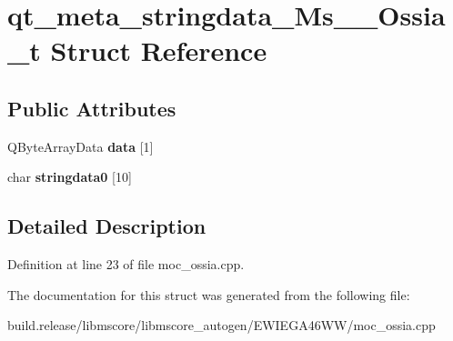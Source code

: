 \hypertarget{structqt__meta__stringdata___ms_____ossia__t}{}\section{qt\+\_\+meta\+\_\+stringdata\+\_\+\+Ms\+\_\+\+\_\+\+Ossia\+\_\+t Struct Reference}
\label{structqt__meta__stringdata___ms_____ossia__t}
\subsection*{Public Attributes}
\begin{DoxyCompactItemize}
\item 
\mbox{\label{structqt__meta__stringdata___ms_____ossia__t_a6a14c4652021f1ccadd269c8901628c2}} 
Q\+Byte\+Array\+Data {\bfseries data} \mbox{[}1\mbox{]}
\item 
\mbox{\label{structqt__meta__stringdata___ms_____ossia__t_a646625017b5ab6fce4c8272b7e32ff45}} 
char {\bfseries stringdata0} \mbox{[}10\mbox{]}
\end{DoxyCompactItemize}


\subsection{Detailed Description}


Definition at line 23 of file moc\+\_\+ossia.\+cpp.



The documentation for this struct was generated from the following file\+:\begin{DoxyCompactItemize}
\item 
build.\+release/libmscore/libmscore\+\_\+autogen/\+E\+W\+I\+E\+G\+A46\+W\+W/moc\+\_\+ossia.\+cpp\end{DoxyCompactItemize}
